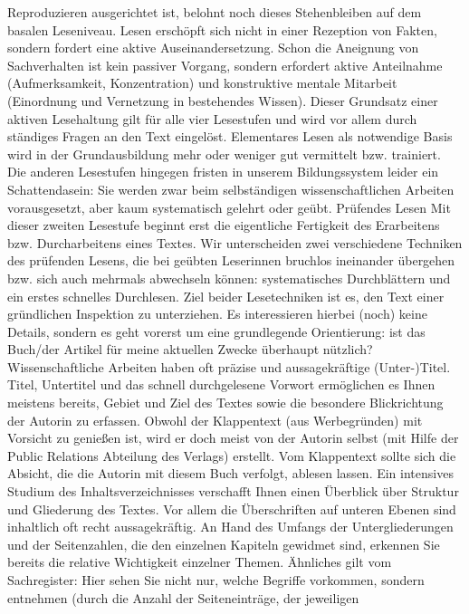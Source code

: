 \documentclass[]{book}
\theoremstyle{definition}
\theoremstyle{definition}
\theoremstyle{definition}
\theoremstyle{remark}
\begin{document}
Reproduzieren ausgerichtet ist, belohnt noch dieses Stehenbleiben auf
dem basalen Leseniveau. Lesen erschöpft sich nicht in einer Rezeption
von Fakten, sondern fordert eine aktive Auseinandersetzung. Schon die
Aneignung von Sachverhalten ist kein passiver Vorgang, sondern erfordert
aktive Anteilnahme (Aufmerksamkeit, Konzentration) und konstruktive
mentale Mitarbeit (Einordnung und Vernetzung in bestehendes Wissen).
Dieser Grundsatz einer aktiven Lesehaltung gilt für alle vier Lesestufen
und wird vor allem durch ständiges Fragen an den Text eingelöst.
Elementares Lesen als notwendige Basis wird in der Grundausbildung mehr
oder weniger gut vermittelt bzw. trainiert. Die anderen Lesestufen
hingegen fristen in unserem Bildungssystem leider ein Schattendasein:
Sie werden zwar beim selbständigen wissenschaftlichen Arbeiten
vorausgesetzt, aber kaum systematisch gelehrt oder geübt. Prüfendes
Lesen Mit dieser zweiten Lesestufe beginnt erst die eigentliche
Fertigkeit des Erarbeitens bzw. Durcharbeitens eines Textes. Wir
unterscheiden zwei verschiedene Techniken des prüfenden Lesens, die bei
geübten Leserinnen bruchlos ineinander übergehen bzw. sich auch mehrmals
abwechseln können: systematisches Durchblättern und ein erstes schnelles
Durchlesen. Ziel beider Lesetechniken ist es, den Text einer gründlichen
Inspektion zu unterziehen. Es interessieren hierbei (noch) keine
Details, sondern es geht vorerst um eine grundlegende Orientierung: ist
das Buch/der Artikel für meine aktuellen Zwecke überhaupt nützlich?
Wissenschaftliche Arbeiten haben oft präzise und aussagekräftige
(Unter-)Titel. Titel, Untertitel und das schnell durchgelesene Vorwort
ermöglichen es Ihnen meistens bereits, Gebiet und Ziel des Textes sowie
die besondere Blickrichtung der Autorin zu erfassen. Obwohl der
Klappentext (aus Werbegründen) mit Vorsicht zu genießen ist, wird er
doch meist von der Autorin selbst (mit Hilfe der Public Relations
Abteilung des Verlags) erstellt. Vom Klappentext sollte sich die
Absicht, die die Autorin mit diesem Buch verfolgt, ablesen lassen. Ein
intensives Studium des Inhaltsverzeichnisses verschafft Ihnen einen
Überblick über Struktur und Gliederung des Textes. Vor allem die
Überschriften auf unteren Ebenen sind inhaltlich oft recht
aussagekräftig. An Hand des Umfangs der Untergliederungen und der
Seitenzahlen, die den einzelnen Kapiteln gewidmet sind, erkennen Sie
bereits die relative Wichtigkeit einzelner Themen. Ähnliches gilt vom
Sachregister: Hier sehen Sie nicht nur, welche Begriffe vorkommen,
sondern entnehmen (durch die Anzahl der Seiteneinträge, der jeweiligen
\end{document}
